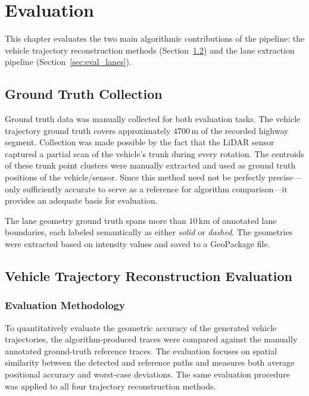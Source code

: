 \chapter{Evaluation}
\label{ch:eval}

This chapter evaluates the two main algorithmic contributions of the pipeline: the vehicle trajectory reconstruction methods (Section~\ref{sec:eval_trace}) and the lane extraction pipeline (Section~\ref{sec:eval_lanes}).

\section{Ground Truth Collection}
\label{sec:eval_gt}

Ground truth data was manually collected for both evaluation tasks. The vehicle trajectory ground truth covers approximately $4700\,\mathrm{m}$ of the recorded highway segment. Collection was made possible by the fact that the LiDAR sensor captured a partial scan of the vehicle's trunk during every rotation. The centroids of these trunk point clusters were manually extracted and used as ground truth positions of the vehicle/sensor. Since this method need not be perfectly precise---only sufficiently accurate to serve as a reference for algorithm comparison---it provides an adequate basis for evaluation.

The lane geometry ground truth spans more than $10\,\mathrm{km}$ of annotated lane boundaries, each labeled semantically as either \emph{solid} or \emph{dashed}. The geometries were extracted based on intensity values and saved to a GeoPackage file.

\section{Vehicle Trajectory Reconstruction Evaluation}
\label{sec:eval_trace}

\subsection{Evaluation Methodology}
\label{sec:eval_trace_method}

To quantitatively evaluate the geometric accuracy of the generated vehicle trajectories, the algorithm-produced traces were compared against the manually annotated ground-truth reference traces. The evaluation focuses on spatial similarity between the detected and reference paths and measures both average positional accuracy and worst-case deviations. The same evaluation procedure was applied to all four trajectory reconstruction methods.

